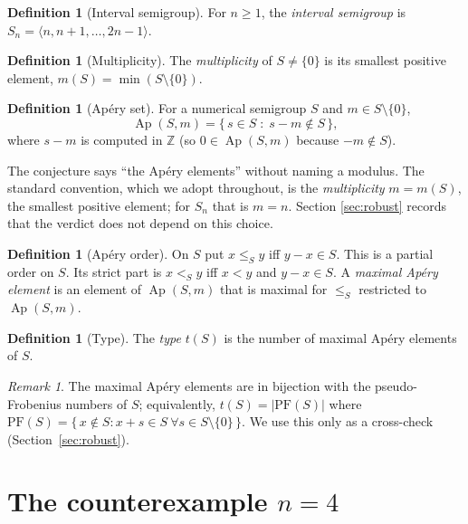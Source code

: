 \documentclass[11pt]{article}
\theoremstyle{definition}
\newtheorem{definition}[theorem]{Definition}
\theoremstyle{remark}
\newtheorem{remark}[theorem]{Remark}
\newcommand{\Ap}{\operatorname{Ap}}
\newcommand{\gen}[1]{\langle #1 \rangle}
\begin{document}
\begin{definition}[Interval semigroup]
For $n \ge 1$, the \emph{interval semigroup} is
$S_n = \gen{n, n+1, \dots, 2n-1}$.
\end{definition}

\begin{definition}[Multiplicity]
The \emph{multiplicity} of $S \neq \{0\}$ is its smallest positive element,
$m(S) = \min(S \setminus \{0\})$.
\end{definition}

\begin{definition}[Apéry set]\label{def:apery}
For a numerical semigroup $S$ and $m \in S \setminus \{0\}$,
\[
\Ap(S,m) = \{\, s \in S \;:\; s - m \notin S \,\},
\]
where $s - m$ is computed in $\mathbb{Z}$ (so $0 \in \Ap(S,m)$ because
$-m \notin S$).
\end{definition}

The conjecture says ``the Apéry elements'' without naming a modulus. The
standard convention, which we adopt throughout, is the \emph{multiplicity}
$m = m(S)$, the smallest positive element; for $S_n$ that is $m = n$. Section
\ref{sec:robust} records that the verdict does not depend on this choice.

\begin{definition}[Apéry order]\label{def:order}
On $S$ put $x \le_S y$ iff $y - x \in S$. This is a partial order on $S$. Its
strict part is $x <_S y$ iff $x < y$ and $y - x \in S$. A \emph{maximal Apéry
element} is an element of $\Ap(S,m)$ that is maximal for $\le_S$ restricted to
$\Ap(S,m)$.
\end{definition}

\begin{definition}[Type]\label{def:type}
The \emph{type} $t(S)$ is the number of maximal Apéry elements of $S$.
\end{definition}

\begin{remark}
The maximal Apéry elements are in bijection with the pseudo-Frobenius numbers
of $S$; equivalently, $t(S) = |\mathrm{PF}(S)|$ where
$\mathrm{PF}(S) = \{\, x \notin S : x + s \in S \ \forall s \in S\setminus\{0\}
\,\}$. We use this only as a cross-check (Section~\ref{sec:robust}).
\end{remark}

\section{The counterexample $n = 4$}\label{sec:n4}
\end{document}

